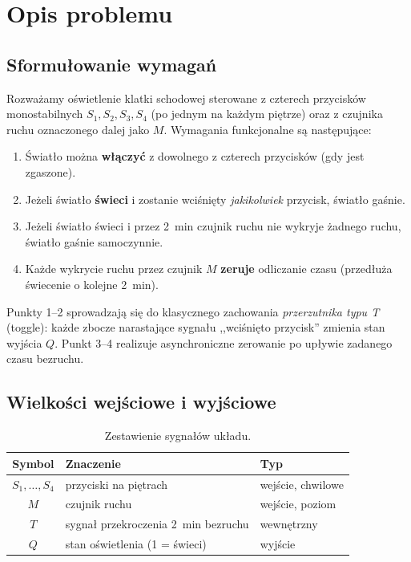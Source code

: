 \section{Opis problemu}
\label{sec:problem}

\subsection{Sformułowanie wymagań}
Rozważamy oświetlenie klatki schodowej sterowane z czterech przycisków
monostabilnych $S_1, S_2, S_3, S_4$ (po jednym na każdym piętrze) oraz
z czujnika ruchu oznaczonego dalej jako $M$. Wymagania
funkcjonalne są następujące:

\begin{enumerate}
    \item Światło można \textbf{włączyć} z dowolnego z czterech przycisków
          (gdy jest zgaszone).
    \item Jeżeli światło \textbf{świeci} i zostanie wciśnięty
          \emph{jakikolwiek} przycisk, światło gaśnie.
    \item Jeżeli światło świeci i przez \SI{2}{\minute} czujnik ruchu nie
          wykryje żadnego ruchu, światło gaśnie samoczynnie.
    \item Każde wykrycie ruchu przez czujnik $M$ \textbf{zeruje} odliczanie
          czasu (przedłuża świecenie o kolejne \SI{2}{\minute}).
\end{enumerate}

Punkty 1–2 sprowadzają się do klasycznego zachowania
\emph{przerzutnika typu T} (toggle): każde zbocze narastające sygnału
,,wciśnięto przycisk'' zmienia stan wyjścia $Q$. Punkt 3–4 realizuje
asynchroniczne zerowanie po upływie zadanego czasu bezruchu.

\subsection{Wielkości wejściowe i wyjściowe}
\begin{table}[H]
\centering
\caption{Zestawienie sygnałów układu.}
\begin{tabular}{cll}
\toprule
Symbol & Znaczenie & Typ \\
\midrule
$S_1,\dots,S_4$ & przyciski na piętrach & wejście, chwilowe \\
$M$              & czujnik ruchu     & wejście, poziom \\
$T$              & sygnał przekroczenia \SI{2}{\minute} bezruchu & wewnętrzny \\
$Q$              & stan oświetlenia (1 = świeci) & wyjście \\
\bottomrule
\end{tabular}
\end{table}

